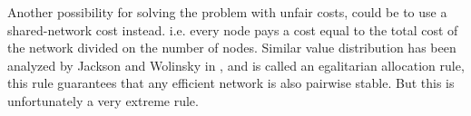 Another possibility for solving the problem with unfair costs, could be to use a shared-network cost instead. i.e. every node pays a cost equal to the total cost of the network divided on the number of nodes. 
Similar value distribution has been analyzed by Jackson and Wolinsky in \cite{jackson1996strategic}, and is called an egalitarian allocation rule, this rule guarantees that any efficient network is also pairwise stable. But this is unfortunately a very extreme rule.




